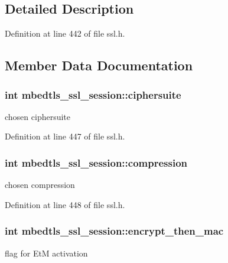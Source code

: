 \subsection{Detailed Description}


Definition at line 442 of file ssl.\-h.



\subsection{Member Data Documentation}
\hypertarget{structmbedtls__ssl__session_ad91239f4186bd272e3eb441c9c309b9e}{
\subsubsection[{ciphersuite}]{\setlength{\rightskip}{0pt plus 5cm}int mbedtls\-\_\-ssl\-\_\-session\-::ciphersuite}}\label{structmbedtls__ssl__session_ad91239f4186bd272e3eb441c9c309b9e}
chosen ciphersuite 

Definition at line 447 of file ssl.\-h.

\hypertarget{structmbedtls__ssl__session_a71b31d138a01adef0ef99f03084da801}{
\subsubsection[{compression}]{\setlength{\rightskip}{0pt plus 5cm}int mbedtls\-\_\-ssl\-\_\-session\-::compression}}\label{structmbedtls__ssl__session_a71b31d138a01adef0ef99f03084da801}
chosen compression 

Definition at line 448 of file ssl.\-h.

\hypertarget{structmbedtls__ssl__session_ac0ac3fa9cca796f14ae26cfbeb28e807}{
\subsubsection[{encrypt\-\_\-then\-\_\-mac}]{\setlength{\rightskip}{0pt plus 5cm}int mbedtls\-\_\-ssl\-\_\-session\-::encrypt\-\_\-then\-\_\-mac}}\label{structmbedtls__ssl__session_ac0ac3fa9cca796f14ae26cfbeb28e807}
flag for Et\-M activation 

